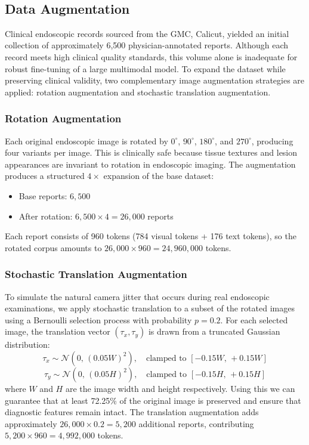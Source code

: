 ﻿﻿\documentclass[12pt]{report}
\begin{document}
\clearpage
\subsection{Data Augmentation}
Clinical endoscopic records sourced from the GMC, Calicut, yielded an initial collection of approximately 6,500 physician-annotated reports. Although each record meets high clinical quality standards, this volume alone is inadequate for robust fine-tuning of a large multimodal model. To expand the dataset while preserving clinical validity, two complementary image augmentation strategies are applied: rotation augmentation and stochastic translation augmentation.

\subsubsection{Rotation Augmentation}
Each original endoscopic image is rotated by $0^\circ$, $90^\circ$, $180^\circ$, and $270^\circ$, producing four variants per image. This is clinically safe because tissue textures and lesion appearances are invariant to rotation in endoscopic imaging. The augmentation produces a structured $4\times$ expansion of the base dataset:
\begin{itemize}
\item Base reports: $6{,}500$
\item After rotation: $6{,}500 \times 4 = 26{,}000$ reports
\end{itemize}
Each report consists of 960 tokens (784 visual tokens + 176 text tokens), so the rotated corpus amounts to $26{,}000 \times 960 = 24{,}960{,}000$ tokens.

\subsubsection{Stochastic Translation Augmentation}
To simulate the natural camera jitter that occurs during real endoscopic examinations, we apply stochastic translation to a subset of the rotated images using a Bernoulli selection process with probability $p = 0.2$. For each selected image, the translation vector $(\tau_x, \tau_y)$ is drawn from a truncated Gaussian distribution:
\[
\tau_x \sim \mathcal{N}(0,\,(0.05W)^2), \quad \text{clamped to } [-0.15W,\, +0.15W]
\]
\[
\tau_y \sim \mathcal{N}(0,\,(0.05H)^2), \quad \text{clamped to } [-0.15H,\, +0.15H]
\]
where $W$ and $H$ are the image width and height respectively. Using this we can guarantee that at least 72.25\% of the original image is preserved and ensure that diagnostic features remain intact. The translation augmentation adds approximately $26{,}000 \times 0.2 = 5{,}200$ additional reports, contributing $5{,}200 \times 960 = 4{,}992{,}000$ tokens.
\end{document}
